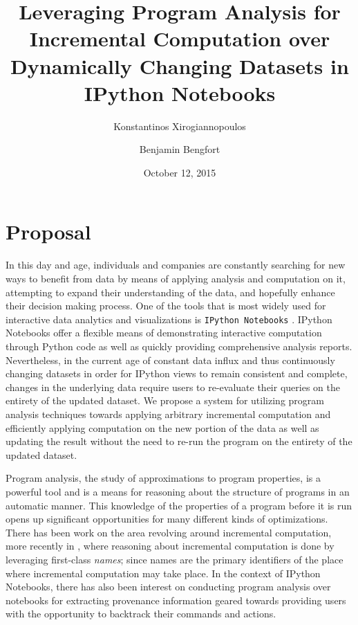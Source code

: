 \documentclass[11pt,letterpaper]{article}
\begin{document}
\title{Leveraging Program Analysis for Incremental Computation over Dynamically Changing Datasets in IPython Notebooks}
\author{Konstantinos Xirogiannopoulos}
\author{Benjamin Bengfort}

\date{October 12, 2015}

\maketitle
\section{Proposal}

In this day and age, individuals and companies are constantly searching for new ways to benefit from data by means of applying analysis and computation on it, attempting to expand their understanding of the data, and hopefully enhance their decision making process. One of the tools that is most widely used for interactive data analytics and visualizations is \texttt{IPython Notebooks} \cite{perez2007ipython}. IPython Notebooks offer a flexible  means of demonstrating interactive computation through Python code as well as quickly providing comprehensive analysis reports. Nevertheless, in the current age of constant data influx and thus continuously changing datasets in order for IPython views to remain consistent and complete, changes in the underlying data require users to re-evaluate their queries on the entirety of the updated dataset. We propose a system for utilizing program analysis techniques towards applying arbitrary incremental computation and efficiently applying computation on the new portion of the data as well as updating the result without the need to re-run the program on the entirety of the updated dataset.

Program analysis, the study of approximations to program properties, is a powerful tool and is a means for reasoning about the structure of programs in an automatic manner. This knowledge of the properties of a program before it is run opens up significant opportunities for many different kinds of optimizations. There has been work on the area revolving around incremental computation, more recently in \cite{hammer2015incremental}, where reasoning about incremental computation is done by leveraging first-class \textit{names}; since names are the primary identifiers of the place where incremental computation may take place. In the context of IPython Notebooks, there has also been interest on conducting program analysis over notebooks for extracting provenance information \cite{pimentel2015collecting} geared towards providing users with the opportunity to backtrack their commands and actions.
\end{document}
